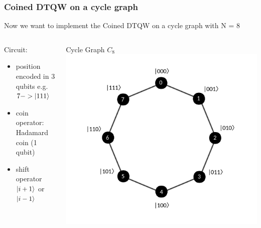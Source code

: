 \documentclass{beamer}
\begin{document}
\begin{frame}
    \frametitle{Coined DTQW on a cycle graph}
    Now we want to implement the Coined DTQW on a cycle graph with N = 8

    \begin{columns}[T]
        \begin{column}{.5\textwidth}
            \begin{block}{Circuit:}
                \begin{itemize}
                    \item position encoded in 3 qubits e.g. $7 -> \ket{111}$
                    \item coin operator: Hadamard coin (1 qubit)
                    \item shift operator $\ket{i + 1}$ or $\ket{i - 1}$
                \end{itemize}
            \end{block}
        \end{column}
        \begin{column}{.5\textwidth}
            \begin{block}{Cycle Graph $C_{8}$}
                \includegraphics[scale=0.2]{img/cyclic_graph.png}
                \centering
            \end{block}
        \end{column}
    \end{columns}
\end{frame}
\end{document}
